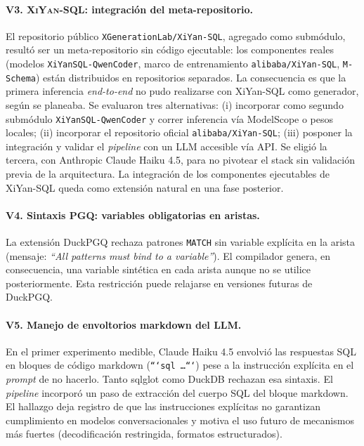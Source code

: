 \paragraph{V3. \textsc{XiYan-SQL}: integración del meta-repositorio.} El repositorio público \texttt{XGenerationLab/XiYan-SQL}, agregado como submódulo, resultó ser un meta-repositorio sin código ejecutable: los componentes reales (modelos \texttt{XiYanSQL-QwenCoder}, marco de entrenamiento \texttt{alibaba/XiYan-SQL}, \texttt{M-Schema}) están distribuidos en repositorios separados. La consecuencia es que la primera inferencia \emph{end-to-end} no pudo realizarse con XiYan-SQL como generador, según se planeaba. Se evaluaron tres alternativas: (i) incorporar como segundo submódulo \texttt{XiYanSQL-QwenCoder} y correr inferencia vía ModelScope o pesos locales; (ii) incorporar el repositorio oficial \texttt{alibaba/XiYan-SQL}; (iii) posponer la integración y validar el \emph{pipeline} con un \ac{LLM} accesible vía API. Se eligió la tercera, con Anthropic Claude Haiku 4.5, para no pivotear el stack sin validación previa de la arquitectura. La integración de los componentes ejecutables de XiYan-SQL queda como extensión natural en una fase posterior.

\paragraph{V4. Sintaxis PGQ: variables obligatorias en aristas.} La extensión DuckPGQ rechaza patrones \texttt{MATCH} sin variable explícita en la arista (mensaje: \emph{``All patterns must bind to a variable''}). El compilador genera, en consecuencia, una variable sintética en cada arista aunque no se utilice posteriormente. Esta restricción puede relajarse en versiones futuras de DuckPGQ.

\paragraph{V5. Manejo de envoltorios markdown del \ac{LLM}.} En el primer experimento medible, Claude Haiku 4.5 envolvió las respuestas SQL en bloques de código markdown (\texttt{```sql \ldots```}) pese a la instrucción explícita en el \emph{prompt} de no hacerlo. Tanto sqlglot como DuckDB rechazan esa sintaxis. El \emph{pipeline} incorporó un paso de extracción del cuerpo SQL del bloque markdown. El hallazgo deja registro de que las instrucciones explícitas no garantizan cumplimiento en modelos conversacionales y motiva el uso futuro de mecanismos más fuertes (decodificación restringida, formatos estructurados).

